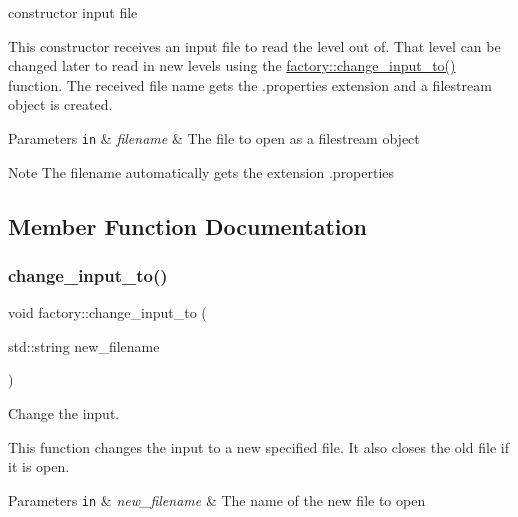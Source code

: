 constructor input file 

This constructor receives an input file to read the level out of. That level can be changed later to read in new levels using the \hyperlink{classfactory_a9e164a8fbb65188de99c39d55d7cc384}{factory\+::change\+\_\+input\+\_\+to()} function. The received file name gets the .properties extension and a filestream object is created. 
\begin{DoxyParams}[1]{Parameters}
\mbox{\tt in}  & {\em filename} & The file to open as a filestream object \\
\hline
\end{DoxyParams}
\begin{DoxyNote}{Note}
The filename automatically gets the extension .properties 
\end{DoxyNote}


\subsection{Member Function Documentation}
\mbox{\label{classfactory_a9e164a8fbb65188de99c39d55d7cc384}} 
\subsubsection{\texorpdfstring{change\+\_\+input\+\_\+to()}{change\_input\_to()}}
{\footnotesize\ttfamily void factory\+::change\+\_\+input\+\_\+to (\begin{DoxyParamCaption}\item[{std\+::string}]{new\+\_\+filename }\end{DoxyParamCaption})}



Change the input. 

This function changes the input to a new specified file. It also closes the old file if it is open. 
\begin{DoxyParams}[1]{Parameters}
\mbox{\tt in}  & {\em new\+\_\+filename} & The name of the new file to open \\
\hline
\end{DoxyParams}
\mbox{\label{classfactory_af9bb026273b34fc032ca5ac73d457611}} 
